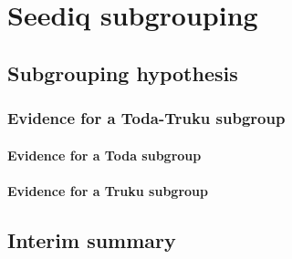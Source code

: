 \chapter{Seediq subgrouping}

\section{Subgrouping hypothesis}
\lipsum[1]
\subsection{Evidence for a Toda-Truku subgroup}
\lipsum[1]
\subsubsection{Evidence for a Toda subgroup}
\lipsum[1]
\subsubsection{Evidence for a Truku subgroup}
\lipsum[1]

\section{Interim summary}
\lipsum[1]